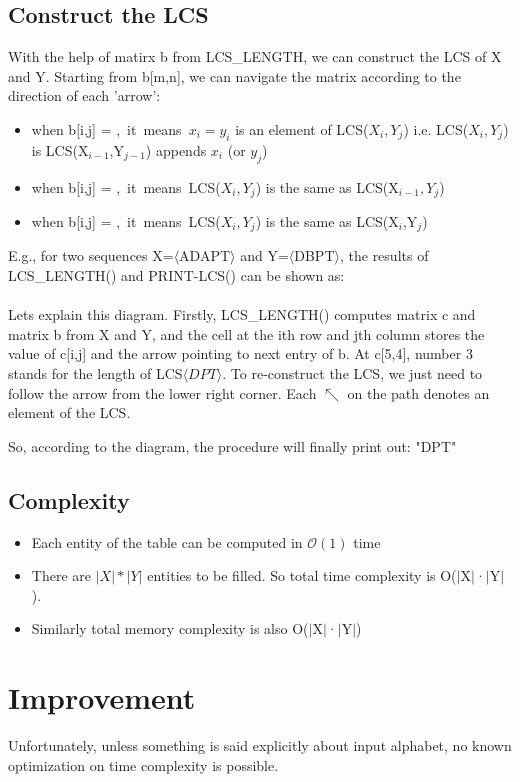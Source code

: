 \documentclass{report}
\begin{document}
    \section{Construct the LCS}
    With the help of matirx b from LCS\_LENGTH, we can construct the LCS of X and Y. Starting from b[m,n], we can navigate the matrix according to the direction of each 'arrow':
    \begin{itemize}
        \item when b[i,j] = \nwarrow,~it~means~$x_i=y_i$ is an element of LCS($X_i,Y_j$) i.e. LCS($X_i,Y_j$) is LCS(X$_{i-1}$,Y$_{j-1}$) appends $x_i$ (or $y_j$)
        \item when b[i,j] = \uparrow,~it~means~LCS($X_i,Y_j$) is the same as LCS(X$_{i-1},Y_j$)
        \item when b[i,j] = \leftarrow,~it~means~LCS($X_i,Y_j$) is the same as LCS(X$_i$,Y$_j$)
    \end{itemize}
    
    E.g., for two sequences X=$\langle$ADAPT$\rangle$ and Y=$\langle$DBPT$\rangle$, the results of LCS\_LENGTH() and PRINT-LCS() can be shown as:\\\\
    
    \bigskip
    Lets explain this diagram. Firstly, LCS\_LENGTH() computes matrix c and matrix b from X and Y, and the cell at the ith row and jth column stores the value of c[i,j] and the arrow pointing to next entry of b. At c[5,4], number 3 stands for the length of LCS$\langle DPT \rangle$. To re-construct the LCS, we just need to follow the arrow from the lower right corner. Each $\nwarrow$ on the path denotes an element of the LCS.
    
    
    So, according to the diagram, the procedure will finally print out: "DPT"
    
    \section{Complexity}
    \begin{itemize}
        \item Each entity of the table can be computed in $\mathcal{O}(1)$ time
        \item There are $|X|*|Y|$ entities to be filled. So total time complexity is O($|$X$|$·$|$Y$|$).
        \item Similarly total memory complexity is also O($|$X$|$·$|$Y$|$)
    \end{itemize}
    \chapter{Improvement}
    Unfortunately, unless something is said explicitly about input alphabet, no known optimization on time complexity is possible.
    
\end{document}
